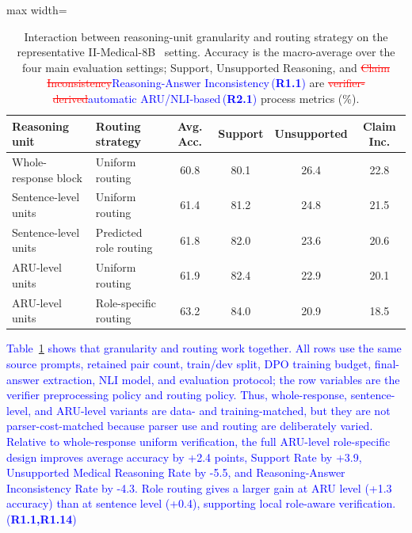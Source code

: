 \documentclass[a4paper,fleqn,doubleblind]{cas-sc}
\DeclareRobustCommand{\deleted}[1]{\textcolor{red}{\sout{#1}}}
\DeclareRobustCommand{\added}[1]{\textcolor{blue}{#1}}
\DeclareRobustCommand{\revtag}[1]{\textcolor{blue}{\scriptsize\,(\textbf{#1})}}
\begin{document}
\begin{table}[htbp]
    \centering
    \begingroup\color{blue}
    \renewcommand{\arraystretch}{1.1}
    \footnotesize
    \caption[Interaction between reasoning-unit granularity and routing.]{Interaction between reasoning-unit granularity and routing strategy on the representative II-Medical-8B~\cite{intelligentinternet2025iimedical8b} setting. Accuracy is the macro-average over the four main evaluation settings; Support, Unsupported Reasoning, and \deleted{Claim Inconsistency}\added{Reasoning-Answer Inconsistency}\revtag{R1.1} are \deleted{verifier-derived}\added{automatic ARU/NLI-based}\revtag{R2.1} process metrics (\%).}
    \label{tab:ablation_granularity_routing}
    \begin{adjustbox}{max width=\textwidth}
        \begin{tabular}{llcccc}
            \toprule
            \textbf{Reasoning unit} & \textbf{Routing strategy} & \textbf{Avg. Acc.} & \textbf{Support} & \textbf{Unsupported} & \textbf{Claim Inc.} \\
            \midrule
            Whole-response block & Uniform routing & 60.8 & 80.1 & 26.4 & 22.8 \\
            Sentence-level units & Uniform routing & 61.4 & 81.2 & 24.8 & 21.5 \\
            Sentence-level units & Predicted role routing & 61.8 & 82.0 & 23.6 & 20.6 \\
            ARU-level units & Uniform routing & 61.9 & 82.4 & 22.9 & 20.1 \\
            ARU-level units & Role-specific routing & 63.2 & 84.0 & 20.9 & 18.5 \\
            \bottomrule
        \end{tabular}
    \end{adjustbox}
    \endgroup
\end{table}

\added{Table~\ref{tab:ablation_granularity_routing} shows that granularity and routing work together. All rows use the same source prompts, retained pair count, train/dev split, DPO training budget, final-answer extraction, NLI model, and evaluation protocol; the row variables are the verifier preprocessing policy and routing policy. Thus, whole-response, sentence-level, and ARU-level variants are data- and training-matched, but they are not parser-cost-matched because parser use and routing are deliberately varied. Relative to whole-response uniform verification, the full ARU-level role-specific design improves average accuracy by +2.4 points, Support Rate by +3.9, Unsupported Medical Reasoning Rate by -5.5, and Reasoning-Answer Inconsistency Rate by -4.3. Role routing gives a larger gain at ARU level (+1.3 accuracy) than at sentence level (+0.4), supporting local role-aware verification.}\revtag{R1.1,R1.14}
\end{document}
